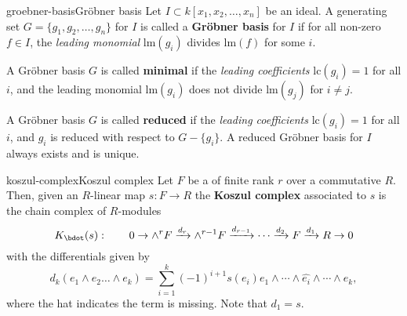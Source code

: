 \begin{topic}{groebner-basis}{Gröbner basis}
    Let $I \subset k[x_1, x_2, \ldots, x_n]$ be an ideal. A generating set $G = \{ g_1, g_2, \ldots, g_n \}$ for $I$ is called a \textbf{Gröbner basis} for $I$ if for all non-zero $f \in I$, the \textit{leading monomial} $\text{lm}(g_i)$ divides $\text{lm}(f)$ for some $i$.
    
    A Gröbner basis $G$ is called \textbf{minimal} if the \textit{leading coefficients} $\text{lc}(g_i) = 1$ for all $i$, and the leading monomial $\text{lm}(g_i)$ does not divide $\text{lm}(g_j)$ for $i \ne j$.
    
    A Gröbner basis $G$ is called \textbf{reduced} if the \textit{leading coefficients} $\text{lc}(g_i) = 1$ for all $i$, and $g_i$ is reduced with respect to $G - \{ g_i \}$. A reduced Gröbner basis for $I$ always exists and is unique.
\end{topic}



\begin{topic}{koszul-complex}{Koszul complex}
    Let $F$ be a  of finite rank $r$ over a commutative  $R$. Then, given an $R$-linear map $s : F \to R$ the \textbf{Koszul complex} associated to $s$ is the chain complex of $R$-modules
    \[ K_\bdot(s) : \qquad 0 \to \wedge^r F \xrightarrow{d_r} \wedge^{r - 1} F \xrightarrow{d_{r - 1}} \cdots \xrightarrow{d_2} F \xrightarrow{d_1} R \to 0 \]
    with the differentials given by
    \[ d_k(e_1 \wedge e_2 \ldots \wedge e_k) = \sum_{i = 1}^{k} (-1)^{i + 1} s(e_i) e_1 \wedge \cdots \wedge \hat{e_i} \wedge \cdots \wedge e_k , \]
    where the hat indicates the term is missing. Note that $d_1 = s$.
\end{topic}